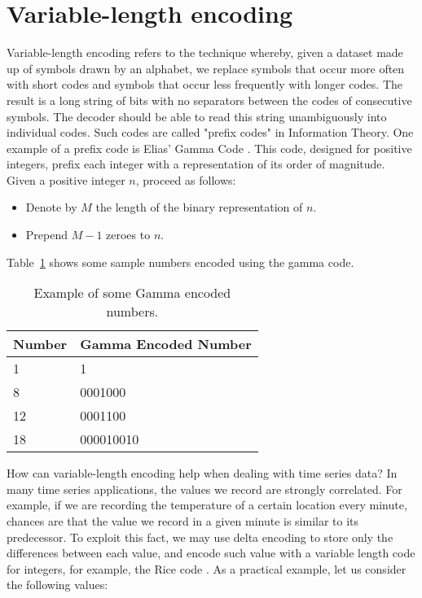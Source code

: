 \section{Variable-length encoding}
Variable-length encoding refers to the technique whereby, given a dataset made up of symbols
drawn by an alphabet, we replace symbols that occur more often with short codes and symbols
that occur less frequently with longer codes. The result is a long string of bits with no
separators between the codes of consecutive symbols. The decoder should be able to read this
string unambiguously into individual codes. Such codes are called "prefix codes"  in
Information Theory.
One example of a prefix code is Elias’ Gamma Code \cite{elias1975universal}. This code, designed for positive
integers, prefix each integer with a representation of its order of magnitude. Given a
positive integer $n$, proceed as follows:
\begin{itemize}
	\item Denote by $M$ the length of the binary representation of $n$.
	\item Prepend $M-1$ zeroes to $n$.
\end{itemize}\par
Table~\ref{tab:elias} shows some sample numbers encoded using the gamma code.
\begin{table}[]
\centering
\begin{tabular}{l|l}
\textbf{Number}     & \textbf{Gamma Encoded Number} \\ 
\hline
1          & 1                    \\ 
8          & 0001000              \\ 
12         & 0001100              \\ 
18         & 000010010            \\ 
\end{tabular}
\caption{Example of some Gamma encoded numbers.}
\label{tab:elias}
\end{table}
How can variable-length encoding help when dealing with time series data?
In many time series applications, the values we record are strongly correlated.
For example, if we are recording the temperature of a certain location every minute,
chances are that the value we record in a given minute is similar to its predecessor.
To exploit this fact, we may use delta encoding to store only the differences between each
value, and encode such value with a variable length code for integers, for example, the
Rice code \cite{Rice1979Some}. As a practical example, let us consider the following values:
